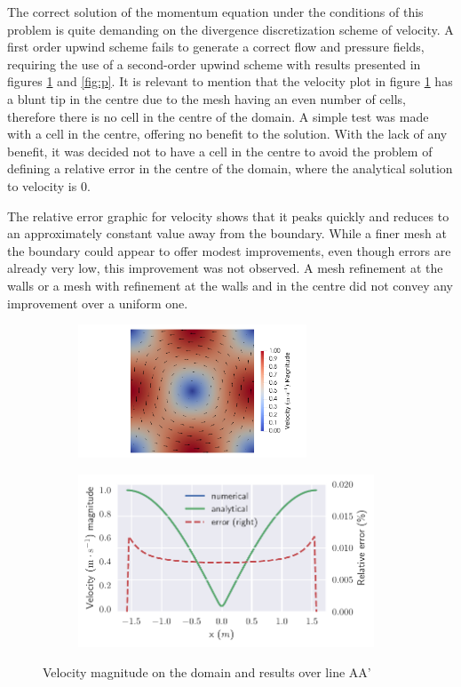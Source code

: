The correct solution of the momentum equation under the conditions of this problem is quite demanding on the divergence discretization scheme of velocity.
A first order upwind scheme fails to generate a correct flow and pressure fields, requiring the use of a second-order upwind scheme with results presented in figures \ref{fig:UMagnitude} and \ref{fig:p}.
It is relevant to mention that the velocity plot in figure \ref{fig:UMagnitude} has a blunt tip in the centre due to the mesh having an even number of cells, therefore there is no cell in the centre of the domain.
A simple test was made with a cell in the centre, offering no benefit to the solution.
With the lack of any benefit, it was decided not to have a cell in the centre to avoid the problem of defining a relative error in the centre of the domain, where the analytical solution to velocity is 0.

The relative error graphic for velocity shows that it peaks quickly and reduces to an approximately constant value away from the boundary.
While a finer mesh at the boundary could appear to offer modest improvements, even though errors are already very low, this improvement was not observed.
A mesh refinement at the walls or a mesh with refinement at the walls and in the centre did not convey any improvement over a uniform one.

\begin{figure}[htbp]
    \centering
    \begin{subfigure}[b]{0.42\textwidth}
        \includegraphics[width=68mm, trim={18cm 0 0 0}, clip]{3_results_and_discussion/figures/UMagnitude_glyph.png}
    \end{subfigure}
    \begin{subfigure}[b]{0.56\textwidth}
        \includegraphics[width=88mm]{3_results_and_discussion/figures/velocity_mag.pdf}
    \end{subfigure}
    \caption{Velocity magnitude on the domain and results over line AA'}
    \label{fig:UMagnitude}
\end{figure}

